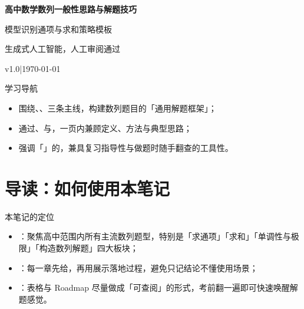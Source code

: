 \documentclass[a4paper,11pt]{ctexart}
\renewcommand{\notetitle}{高中数学数列一般性思路与解题技巧}
\renewcommand{\noteauthor}{生成式人工智能，人工审阅通过}
\renewcommand{\notedate}{\today}
\renewcommand{\notesubtitle}{模型识别\quad 通项与求和\quad 策略模板}
\renewcommand{\noteversion}{v1.0}
\begin{document}
\thispagestyle{empty}
\setcounter{page}{1}

\noindent
\begin{minipage}[t][0.7\textheight][c]{\textwidth}
  \raggedleft
  \vspace*{\fill}
  {\sffamily\bfseries\Huge\color{accent}\notetitle\par}
  \vspace{0.6em}
  {\Large\color{inkgray}\notesubtitle\par}
  \vspace{0.5em}
  {\large\color{inkgray}\noteauthor\par}
  \vspace{0.4em}
  {\normalsize\color{inkgray}\noteversion\quad|\quad\notedate\par}
  \vspace*{\fill}
\end{minipage}

\begin{center}
\begin{minipage}{0.84\textwidth}
  \textcolor{inkgray}{\sffamily\small 学习导航}\\
  \begin{itemize}
    \item 围绕、、三条主线，构建数列题目的「通用解题框架」；
    \item 通过、与，一页内兼顾定义、方法与典型思路；
    \item 强调「」的，兼具复习指导性与做题时随手翻查的工具性。
  \end{itemize}
\end{minipage}
\end{center}
\vspace{1em}

\clearpage
\thispagestyle{plain}
\tableofcontents

\clearpage
\section*{导读：如何使用本笔记}

\begin{summarybox}{本笔记的定位}
  \begin{itemize}
    \item {}：聚焦高中范围内所有主流数列题型，特别是「求通项」「求和」「单调性与极限」「构造数列解题」四大板块；
    \item {}：每一章先给，再用展示落地过程，避免只记结论不懂使用场景；
    \item {}：表格与 Roadmap 尽量做成「可查阅」的形式，考前翻一遍即可快速唤醒解题感觉。
  \end{itemize}
\end{summarybox}
\end{document}
